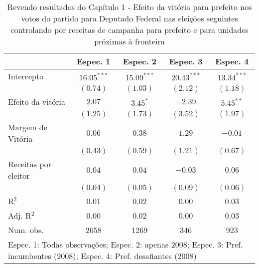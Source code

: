 
\begin{table}
\caption{Revendo resultados do Capítulo 1 - Efeito da vitória para prefeito nos votos do partido para Deputado Federal nas eleições seguintes controlando por receitas de campanha para prefeito e para unidades próximas à fronteira}
\begin{center}
\begin{tabular}{l c c c c }
\hline
                     & Espec. 1 & Espec. 2 & Espec. 3 & Espec. 4 \\
\hline
Intercepto           & $16.05^{***}$ & $15.09^{***}$ & $20.43^{***}$ & $13.34^{***}$ \\
                     & $(0.74)$      & $(1.03)$      & $(2.12)$      & $(1.18)$      \\
Efeito da vitória    & $2.07$        & $3.45^{*}$    & $-2.39$       & $5.45^{**}$   \\
                     & $(1.25)$      & $(1.73)$      & $(3.52)$      & $(1.97)$      \\
Margem de Vitória    & $0.06$        & $0.38$        & $1.29$        & $-0.01$       \\
                     & $(0.43)$      & $(0.59)$      & $(1.21)$      & $(0.67)$      \\
Receitas por eleitor & $0.04$        & $0.04$        & $-0.03$       & $0.06$        \\
                     & $(0.04)$      & $(0.05)$      & $(0.09)$      & $(0.06)$      \\
\hline
R$^2$                & 0.01          & 0.02          & 0.00          & 0.03          \\
Adj. R$^2$           & 0.00          & 0.02          & 0.00          & 0.03          \\
Num. obs.            & 2658          & 1269          & 346           & 923           \\
\hline
\multicolumn{5}{l}{\scriptsize{Espec. 1: Todas observações; Espec. 2: apenas 2008; Espec. 3: Pref. incumbentes (2008); Espec. 4: Pref. desafiantes (2008)}}
\end{tabular}
\label{tab:c4t1}
\end{center}
\end{table}

